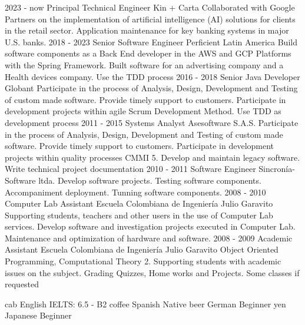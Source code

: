 \documentclass[icon]{twentysecondcv}
\begin{document}
\begin{twenty}
\twentyitem
    {2023 - now}
    {Principal Technical Engineer}
    {Kin + Carta}
    {Collaborated with Google Partners on the implementation of artificial intelligence (AI) solutions for clients in the retail sector. Application maintenance for key banking systems in major U.S. banks. }
\twentyitem
    {2018 - 2023}
    {Senior Software Engineer}
    {Perficient Latin America}
    {Build software components as a Back End developer in the AWS and GCP Platforms with the Spring Framework. Built software for an advertising company and a Health devices company. Use the TDD process}
\twentyitem
    {2016 - 2018}
    {Senior Java Developer}
    {Globant}
    {Participate in the process of Analysis, Design, Development and Testing of custom made software. Provide timely support to customers. Participate in development projects within agile Scrum Development Method. Use TDD as development process}
  \twentyitem
    {2011 - 2015}
    {Systems Analyst}
    {Asesoftware S.A.S.}
    {Participate in the process of Analysis, Design, Development and Testing of custom made software. Provide timely support to customers. Participate in development projects within quality processes CMMI 5. Develop and maintain legacy software. Write technical project documentation}
  \twentyitem
    {2010 - 2011}
    {Software Engineer}
    {Sincron\'ia-Software ltda.}
    {Develop software projects. Testing software components. Accompaniment deployment. Tunning software components.}
\twentyitem
    {2008 - 2010}
    {Computer Lab Assistant}
    {Escuela Colombiana de Ingenier\'ia  Julio Garavito}
    {Supporting students, teachers and other users in the use of Computer Lab services. Develop software and investigation projects executed in Computer Lab. Maintenance and optimization of hardware and software.}
\twentyitem
    {2008 - 2009}
    {Academic Assistant}
    {Escuela Colombiana de Ingenier\'ia  Julio Garavito}
    {Object Oriented Programming, Computational Theory 2. Supporting students with academic issues on the subject. Grading Quizzes, Home works and Projects. Some classes if requested}

\end{twenty}


\begin{twentyshorticon}
  \twentyitemshorticon
    {cab}
    {English}
    {IELTS: 6.5 - B2}
  \twentyitemshorticon
    {coffee}
    {Spanish}
    {Native}
  \twentyitemshorticon
    {beer}
    {German}
    {Beginner}
  \twentyitemshorticon
    {yen}
    {Japanese}
    {Beginner}
\end{twentyshorticon}


\end{document}
